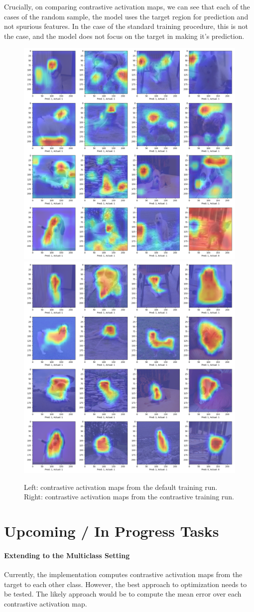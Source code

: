 \documentclass{article}
\begin{document}
Crucially, on comparing contrastive activation maps, we can see that each of the cases of the random sample, the model uses the target region for prediction and not spurious features. In the case of the standard training procedure, this is not the case, and the model does not focus on the target in making it's prediction.

\begin{figure}[H]
	\centering
	\includegraphics[width=.4\textwidth]{img/default_cam.png}
	\hspace{4em}
	\includegraphics[width=.4\textwidth]{img/contrastive_cam.png}
	\caption{Left: contrastive activation maps from the default training run. Right: contrastive activation maps from the contrastive training run.}
\end{figure}

\section{Upcoming / In Progress Tasks} 

\paragraph{Extending to the Multiclass Setting} Currently, the implementation computes contrastive activation maps from the target to each other class. However, the best approach to optimization needs to be tested. The likely approach would be to compute the mean error over each contrastive activation map.
\end{document}

